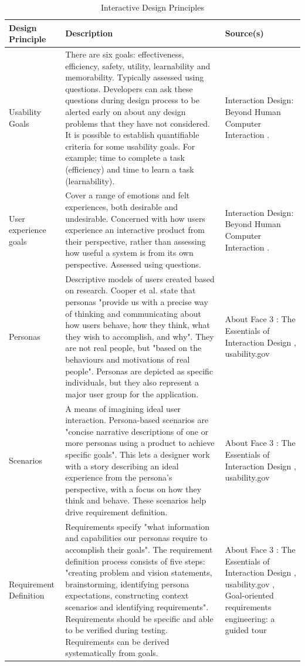 \documentclass[authoryearcitations]{UoYCSproject}
\begin{document}
\begin{table}[tbp]
	\begin{small}
	\center
   \caption{Interactive Design Principles}
  \begin{tabular}{ p{2.0cm} p{9.0cm}  p{2.5cm} }
  		\hline
      \textbf{Design Principle} & \textbf{Description} & \textbf{Source(s)}\\ \hline
    Usability Goals & There are six goals: effectiveness, efficiency, safety, utility, learnability and memorability. Typically assessed using questions. Developers can ask these questions during design process to be alerted early on about any design problems that they have not considered. It is possible to establish quantifiable criteria for some usability goals. For example; time to complete a task (efficiency) and time to learn a task (learnability).  &  Interaction Design: Beyond Human Computer Interaction \citep{Rogers2011}.\\  
     User experience goals & Cover a range of emotions and felt experiences, both desirable and undesirable. Concerned with how users experience an interactive product from their perspective, rather than assessing how useful a system is from its own perspective. Assessed using questions.  &  Interaction Design: Beyond Human Computer Interaction \citep{Rogers2011}.\\ 
       Personas & Descriptive models of users created based on research. Cooper et al. state that personas "provide us with a precise way of thinking and communicating about how users behave, how they think, what they wish to accomplish, and why". They are not real people, but "based on the behaviours and motivations of real people". Personas are depicted as specific individuals, but they also represent a major user group for the application.  &  About Face 3 : The Essentials of Interaction Design \citep{Cooper2007}, usability.gov \citep{USDepartmentofHealthHumanServices}\\  
       Scenarios & A means of imagining ideal user interaction. Persona-based scenarios are "concise narrative descriptions of one or more personas using a product to achieve specific goals". This lets a designer work with a story describing an ideal experience from the persona's perspective, with a focus on how they think and behave. These scenarios help drive requirement definition.  &  About Face 3 : The Essentials of Interaction Design \citep{Cooper2007}, usability.gov \citep{USDepartmentofHealthHumanServices}\\ 
       Requirement Definition & Requirements specify "what information and capabilities our personas require to accomplish their goals". The requirement definition process consists of five steps: "creating problem and vision statements, brainstorming, identifying persona expectations, constructing context scenarios and identifying requirements". Requirements should be specific and able to be verified during testing. Requirements can be derived systematically from goals. &  About Face 3 : The Essentials of Interaction Design \citep{Cooper2007}, usability.gov \citep{USDepartmentofHealthHumanServices}, Goal-oriented requirements engineering: a guided tour \citep{Lamsweerde2001}\\ \hline

\end{tabular}
\end{small}
\end{table}
\end{document}
